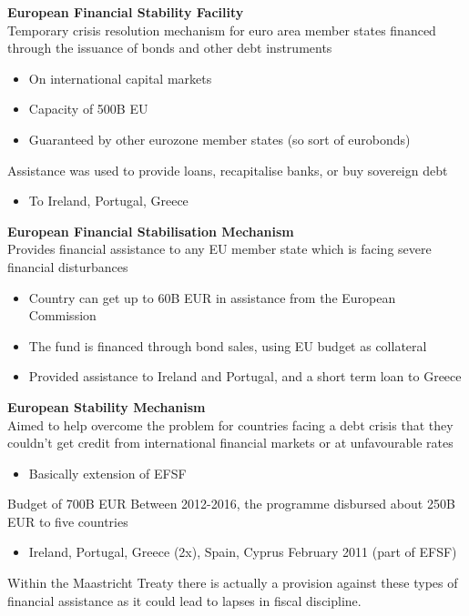 \documentclass{beamer}
\begin{document}
\begin{frame}
  \textbf{European Financial Stability Facility}\\
  Temporary crisis resolution mechanism for euro area member states financed through the issuance of bonds and other debt instruments
  \begin{itemize}
    \item On international capital markets
    \item Capacity of 500B EU
    \item Guaranteed by other eurozone member states (so sort of eurobonds)
  \end{itemize}
    \medskip
   Assistance was used to provide loans, recapitalise banks, or buy sovereign debt    
   \begin{itemize}
     \item To Ireland, Portugal, Greece
   \end{itemize}
\end{frame}

\begin{frame}
  \textbf{European Financial Stabilisation Mechanism}\\
   Provides financial assistance to any EU member state which is facing severe financial disturbances
   \begin{itemize}
     \item Country can get up to 60B EUR in assistance from the European Commission 
     \item The fund is financed through  bond sales, using EU budget as collateral    
    \item Provided assistance to Ireland and Portugal, and a short term loan to Greece
   \end{itemize}
\end{frame}

\begin{frame}
  \textbf{European Stability Mechanism}\\
  Aimed to help overcome the problem for countries facing a debt crisis that they couldn't get credit from international financial markets or at unfavourable rates
  \begin{itemize}
    \item Basically extension of EFSF
  \end{itemize}
  Budget of 700B EUR
  Between 2012-2016, the programme disbursed about 250B EUR to five countries
\begin{itemize}
  \item Ireland, Portugal, Greece (2x), Spain, Cyprus February 2011 (part of EFSF)
\end{itemize}
Within the Maastricht Treaty there is actually a provision against these types of financial assistance as it could lead to lapses in fiscal discipline. 
\end{frame}
\end{document}
